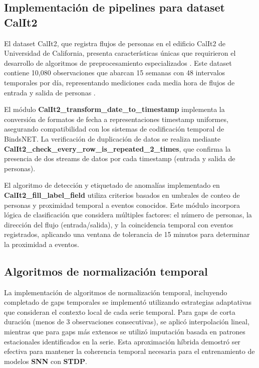\subsection{Implementación de pipelines para dataset CalIt2}

El dataset CalIt2, que registra flujos de personas en el edificio CalIt2 de Universidad de California, presenta características únicas que requirieron el desarrollo de algoritmos de preprocesamiento especializados \cite{UCI_Calit2_2009}. Este dataset contiene 10,080 observaciones que abarcan 15 semanas con 48 intervalos temporales por día, representando mediciones cada media hora de flujos de entrada y salida de personas \cite{UCI_Calit2_2009}.

El módulo \textbf{CalIt2\_transform\_date\_to\_timestamp} implementa la conversión de formatos de fecha a representaciones timestamp uniformes, asegurando compatibilidad con los sistemas de codificación temporal de BindsNET. La verificación de duplicación de datos se realiza mediante \textbf{CalIt2\_check\_every\_row\_is\_repeated\_2\_times}, que confirma la presencia de dos streams de datos por cada timestamp (entrada y salida de personas). 

El algoritmo de detección y etiquetado de anomalías implementado en \textbf{CalIt2\_fill\_label\_field} utiliza criterios basados en umbrales de conteo de personas y proximidad temporal a eventos conocidos. Este módulo incorpora lógica de clasificación que considera múltiples factores: el número de personas, la dirección del flujo (entrada/salida), y la coincidencia temporal con eventos registrados, aplicando una ventana de tolerancia de 15 minutos para determinar la proximidad a eventos. 

\subsection{Algoritmos de normalización temporal}

La implementación de algoritmos de normalización temporal, incluyendo completado de gaps temporales se implementó utilizando estrategias adaptativas que consideran el contexto local de cada serie temporal. Para gaps de corta duración (menos de 3 observaciones consecutivas), se aplicó interpolación lineal, mientras que para gaps más extensos se utilizó imputación basada en patrones estacionales identificados en la serie. Esta aproximación híbrida demostró ser efectiva para mantener la coherencia temporal necesaria para el entrenamiento de modelos \textbf{SNN} con \textbf{STDP}.

